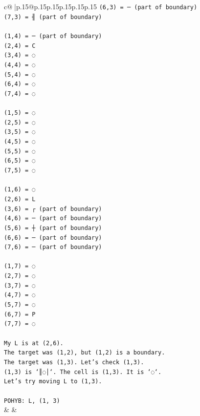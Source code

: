 \documentclass{article}
\begin{document}
{\begin{supertabular}{c@{$\;$}|p{.15\linewidth}@{}p{.15\linewidth}p{.15\linewidth}p{.15\linewidth}p{.15\linewidth}p{.15\linewidth}}
{{{\texttt{(6,3) = ─ (part of boundary)} \\
\texttt{(7,3) = ╢ (part of boundary)} \\
\\ 
\texttt{(1,4) = ─ (part of boundary)} \\
\texttt{(2,4) = C} \\
\texttt{(3,4) = ◌} \\
\texttt{(4,4) = ◌} \\
\texttt{(5,4) = ◌} \\
\texttt{(6,4) = ◌} \\
\texttt{(7,4) = ◌} \\
\\ 
\texttt{(1,5) = ◌} \\
\texttt{(2,5) = ◌} \\
\texttt{(3,5) = ◌} \\
\texttt{(4,5) = ◌} \\
\texttt{(5,5) = ◌} \\
\texttt{(6,5) = ◌} \\
\texttt{(7,5) = ◌} \\
\\ 
\texttt{(1,6) = ◌} \\
\texttt{(2,6) = L} \\
\texttt{(3,6) = ┌ (part of boundary)} \\
\texttt{(4,6) = ─ (part of boundary)} \\
\texttt{(5,6) = ┼ (part of boundary)} \\
\texttt{(6,6) = ─ (part of boundary)} \\
\texttt{(7,6) = ─ (part of boundary)} \\
\\ 
\texttt{(1,7) = ◌} \\
\texttt{(2,7) = ◌} \\
\texttt{(3,7) = ◌} \\
\texttt{(4,7) = ◌} \\
\texttt{(5,7) = ◌} \\
\texttt{(6,7) = P} \\
\texttt{(7,7) = ◌} \\
\\ 
\texttt{My L is at (2,6).} \\
\texttt{The target was (1,2), but (1,2) is a boundary.} \\
\texttt{The target was (1,3). Let's check (1,3).} \\
\texttt{(1,3) is `║◌│`. The cell is (1,3). It is `◌`.} \\
\texttt{Let's try moving L to (1,3).} \\
\\ 
\texttt{POHYB: L, (1, 3)} \\
            }
        }
    }
    & & \\ \\


\end{supertabular}}
\end{document}
